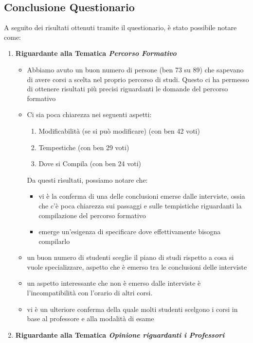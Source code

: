 \subsection{Conclusione Questionario}
A seguito dei risultati ottenuti tramite il questionario, è stato possibile notare come:
\begin{enumerate}
    \item \textbf{Riguardante alla Tematica \textit{Percorso Formativo}}
    \begin{itemize}
        \item Abbiamo avuto un buon numero di persone (ben 73 su 89) che sapevano di avere corsi a scelta nel proprio percorso di studi. 
        Questo ci ha permesso di ottenere risultati più precisi riguardanti le domande del percorso formativo
        \item Ci sia poca chiarezza nei seguenti aspetti:
        \begin{enumerate}
            \item Modificabilità (se si può modificare) (con ben 42 voti)
            \item Tempestiche (con ben 29 voti)
            \item Dove si Compila (con ben 24 voti)
        \end{enumerate}
        Da questi risultati, possiamo notare che:
        \begin{itemize}
            \item vi è la conferma di una delle conclusioni emerse dalle interviste, ossia che
            c'è poca chiarezza sui passaggi e sulle tempistiche riguardanti la compilazione del percorso formativo
            \item emerge un'esigenza di specificare dove effettivamente bisogna compilarlo
        \end{itemize} 
        \item un buon numero di studenti sceglie il piano di studi rispetto a cosa si vuole specializzare, aspetto che è emerso tra le conclusioni delle interviste
        \item un aspetto interessante che non è emerso dalle interviste è l'incompatibilità con l'orario di altri corsi. 
        \item vi è un ulteriore conferma della quale molti studenti scelgono i corsi in base al professore e alla modalità di esame
    \end{itemize}
    \item \textbf{Riguardante alla Tematica \textit{Opinione riguardanti i Professori}}

\end{enumerate}
